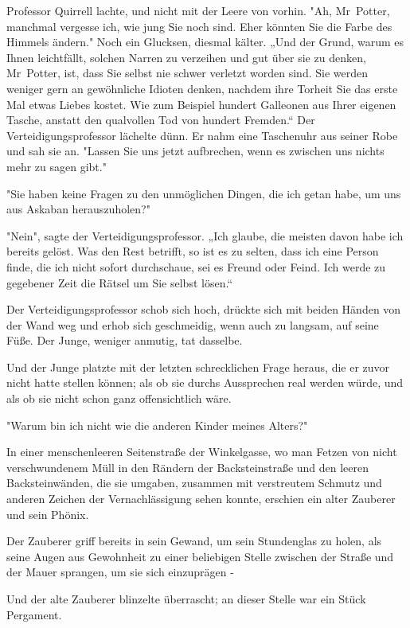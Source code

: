 {Professor Quirrell lachte, und nicht mit der Leere von vorhin. "Ah, Mr~Potter, manchmal vergesse ich, wie jung Sie noch sind. Eher könnten Sie die Farbe des Himmels ändern." Noch ein Glucksen, diesmal kälter. „Und der Grund, warum es Ihnen leichtfällt, solchen Narren zu verzeihen und gut über sie zu denken, Mr~Potter, ist, dass Sie selbst nie schwer verletzt worden sind. Sie werden weniger gern an gewöhnliche Idioten denken, nachdem ihre Torheit Sie das erste Mal etwas Liebes kostet. Wie zum Beispiel hundert Galleonen aus Ihrer eigenen Tasche, anstatt den qualvollen Tod von hundert Fremden.“ Der Verteidigungsprofessor lächelte dünn. Er nahm eine Taschenuhr aus seiner Robe und sah sie an. "Lassen Sie uns jetzt aufbrechen, wenn es zwischen uns nichts mehr zu sagen gibt."

"Sie haben keine Fragen zu den unmöglichen Dingen, die ich getan habe, um uns aus Askaban herauszuholen?"

"Nein", sagte der Verteidigungsprofessor. „Ich glaube, die meisten davon habe ich bereits gelöst. Was den Rest betrifft, so ist es zu selten, dass ich eine Person finde, die ich nicht sofort durchschaue, sei es Freund oder Feind. Ich werde zu gegebener Zeit die Rätsel um Sie selbst lösen.“

Der Verteidigungsprofessor schob sich hoch, drückte sich mit beiden Händen von der Wand weg und erhob sich geschmeidig, wenn auch zu langsam, auf seine Füße. Der Junge, weniger anmutig, tat dasselbe.

Und der Junge platzte mit der letzten schrecklichen Frage heraus, die er zuvor nicht hatte stellen können; als ob sie durchs Aussprechen real werden würde, und als ob sie nicht schon ganz offensichtlich wäre.

"Warum bin ich nicht wie die anderen Kinder meines Alters?"

In einer menschenleeren Seitenstraße der Winkelgasse, wo man Fetzen von nicht verschwundenem Müll in den Rändern der Backsteinstraße und den leeren Backsteinwänden, die sie umgaben, zusammen mit verstreutem Schmutz und anderen Zeichen der Vernachlässigung sehen konnte, erschien ein alter Zauberer und sein Phönix.

Der Zauberer griff bereits in sein Gewand, um sein Stundenglas zu holen, als seine Augen aus Gewohnheit zu einer beliebigen Stelle zwischen der Straße und der Mauer sprangen, um sie sich einzuprägen -

Und der alte Zauberer blinzelte überrascht; an dieser Stelle war ein Stück Pergament.

}
